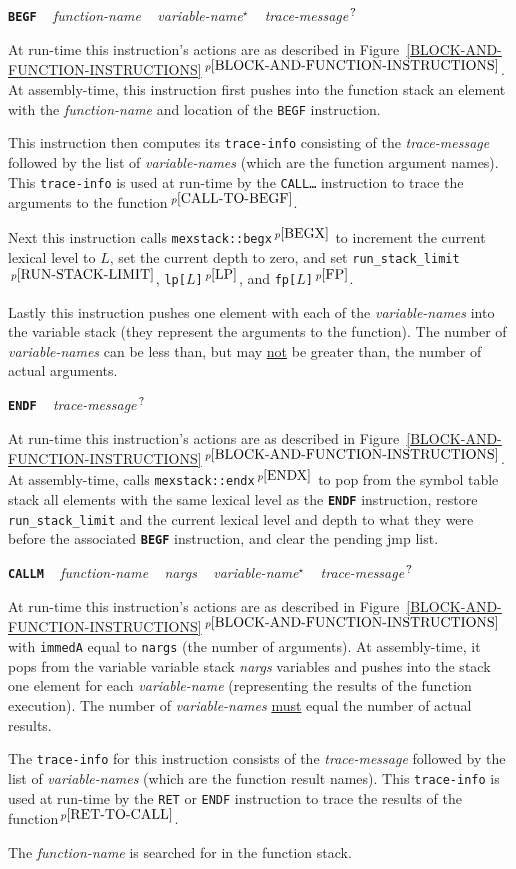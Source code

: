 \documentclass[12pt]{article}
\makeatletter
\newcommand{\TT}[1]{{\tt \bfseries #1}}
\newcommand{\STAR}{{\Large $^\star$}}
\newcommand{\QMARK}{{$^{\,\mbox{\footnotesize ?}}$}}
\newcommand{\ttkey}[1]{\TT{#1}\index{#1@{\tt #1}}}
\newcommand{\itemref}[1]{\ref{#1}$\,^{p\pageref{#1}}$}
\newcommand{\pagnote}[1]{$\,^{p\pageref{#1}}$}
\newenvironment{indpar}[1][0.3in]%
	{\begin{list}{}%
		     {\setlength{\itemsep}{0in}%
		      \setlength{\topsep}{0in}%
		      \setlength{\parsep}{1ex}%
		      \setlength{\labelwidth}{#1}%
		      \setlength{\leftmargin}{#1}%
		      \addtolength{\leftmargin}{\labelsep}}%
	 \item}%
	{\end{list}}
\makeatother
\begin{document}
\ttkey{BEGF}\label{BEGF} ~ {\em function-name} ~ {\em variable-name}\STAR{} ~
	{\em trace-message}\QMARK{}
\begin{indpar}
At run-time this instruction's actions are as described in
Figure~\itemref{BLOCK-AND-FUNCTION-INSTRUCTIONS}.  At assembly-time,
this instruction first pushes into the function stack
an element with the {\em function-name} and location of the {\tt BEGF}
instruction.

This instruction then computes its {\tt trace-info}
consisting of the {\em trace-message} followed by the list of
{\em variable-names} (which are the function argument names).
This {\tt trace-info} is used at run-time by the
{\tt CALL\ldots} instruction to trace the arguments
to the function\pagnote{CALL-TO-BEGF}.

Next this instruction calls {\tt mexstack::begx}\pagnote{BEGX}
to increment the current lexical level to $L$, set the current depth to zero,
and set {\tt run\_stack\_limit}\pagnote{RUN-STACK-LIMIT},
{\tt lp[$L$]}\pagnote{LP}, and {\tt fp[$L$]}\pagnote{FP}.

Lastly this instruction pushes one element with each
of the {\em variable-names} into the variable stack (they
represent the arguments to the function).
The number of {\em variable-names} can be less than,
but may \underline{not} be greater than, the number of actual
arguments.
\end{indpar}

\ttkey{ENDF} ~ {\em trace-message}\QMARK{}
\begin{indpar}
At run-time this instruction's actions are as described in
Figure~\itemref{BLOCK-AND-FUNCTION-INSTRUCTIONS}.
At assembly-time,
calls {\tt mexstack::endx}\pagnote{ENDX} to
pop from the symbol table stack all elements with the
same lexical level as the \TT{ENDF} instruction,
restore 
{\tt run\_stack\_limit} and
the current lexical level and depth to what they were before
the associated \TT{BEGF} instruction, and clear the pending jmp list.
\end{indpar}

\ttkey{CALLM} ~ {\em function-name} ~ {\em nargs} ~
        {\em variable-name}\STAR{} ~ {\em trace-message}\QMARK{}
\begin{indpar}
At run-time this instruction's actions are as described in
Figure~\itemref{BLOCK-AND-FUNCTION-INSTRUCTIONS} with {\tt immedA} equal to
{\tt nargs} (the number of arguments).  At assembly-time,
it pops from the variable variable stack {\em nargs} variables
and pushes into the stack one element for each {\em variable-name}
(representing the results of the function execution).
The number of {\em variable-names} \underline{must} equal
the number of actual results.

The {\tt trace-info} for this instruction
consists of the {\em trace-message} followed by the list of
{\em variable-names} (which are the function result names).
This {\tt trace-info} is used at run-time by the
{\tt RET} or {\tt ENDF} instruction to trace the results
of the function\pagnote{RET-TO-CALL}.

The {\em function-name} is searched for in the function stack.
\end{indpar}
\end{document}
